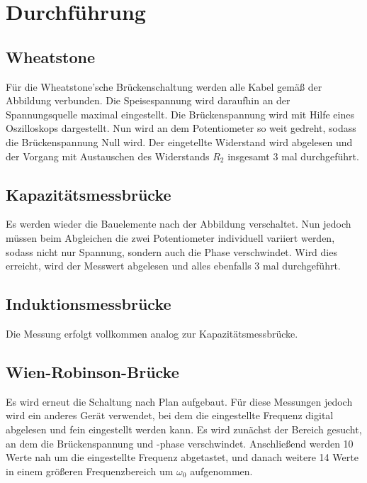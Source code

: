 \section{Durchführung}
\label{sec:Durchführung}
\subsection{Wheatstone}
Für die Wheatstone'sche Brückenschaltung werden alle Kabel gemäß der Abbildung verbunden. Die Speisespannung wird daraufhin an der Spannungsquelle maximal eingestellt.
Die Brückenspannung wird mit Hilfe eines Oszilloskops dargestellt. Nun wird an dem Potentiometer so weit gedreht, sodass die Brückenspannung Null wird.
Der eingetellte Widerstand wird abgelesen und der Vorgang mit Austauschen des Widerstands $R_2$ insgesamt 3 mal durchgeführt.

\subsection{Kapazitätsmessbrücke}
Es werden wieder die Bauelemente nach der Abbildung verschaltet. Nun jedoch müssen beim Abgleichen die zwei Potentiometer individuell variiert werden, sodass nicht nur Spannung, 
sondern auch die Phase verschwindet. Wird dies erreicht, wird der Messwert abgelesen und alles ebenfalls 3 mal durchgeführt.

\subsection{Induktionsmessbrücke}
Die Messung erfolgt vollkommen analog zur Kapazitätsmessbrücke.

\subsection{Wien-Robinson-Brücke}
Es wird erneut die Schaltung nach Plan aufgebaut. Für diese Messungen jedoch wird ein anderes Gerät verwendet, bei dem die eingestellte Frequenz digital abgelesen und fein eingestellt werden kann.
Es wird zunächst der Bereich gesucht, an dem die Brückenspannung und -phase verschwindet. Anschließend werden 10 Werte nah um die eingestellte Frequenz abgetastet, und danach weitere 14 Werte in einem
größeren Frequenzbereich um $\omega_0$ aufgenommen.